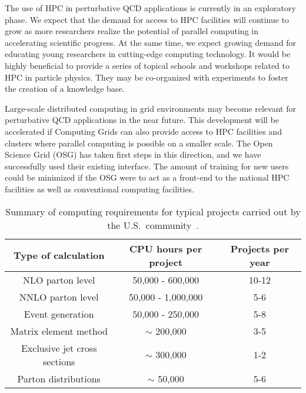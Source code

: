 The use of HPC in perturbative QCD applications is currently in
an exploratory phase. We expect that the demand for access to HPC
facilities will continue to grow as more researchers realize the 
potential of parallel computing in accelerating scientific progress. 
At the same time, we expect growing demand for educating young researchers 
in cutting-edge computing technology. It would be highly beneficial 
to provide a series of topical schools and workshops related 
to HPC in particle physics. They may be co-organized with experiments to foster 
the creation of a knowledge base.

Large-scale distributed computing in grid environments 
may become relevant for perturbative QCD applications 
in the near future. This development will be accelerated if Computing Grids
can also provide access to HPC facilities and clusters where parallel 
computing is possible on a smaller scale. The Open Science Grid (OSG)
has taken first steps in this direction, and we have successfully used their
existing interface. The amount of training for new users could be minimized
if the OSG were to act as a front-end to the national HPC facilities
as well as conventional computing facilities.

\begin{table}
\begin{center}
  \begin{tabular}{ccc}
    \hline
    Type of calculation & CPU hours per project & Projects per year \\
    \hline\hline
    NLO parton level & 50,000 - 600,000 & 10-12\\
    NNLO parton level & 50,000 - 1,000,000 & 5-6\\
    Event generation & 50,000 - 250,000 & 5-8\\
    Matrix element method & $\sim$ 200,000 & 3-5\\
    Exclusive jet cross sections & $\sim$ 300,000 & 1-2\\
    Parton distributions & $\sim$ 50,000 & 5-6\\
    \hline
  \end{tabular}
\end{center}
  \caption{Summary of computing requirements for typical projects
    carried out by the U.S.~community~\cite{HPCWP}.
    \label{tab:summary}}
\end{table}


